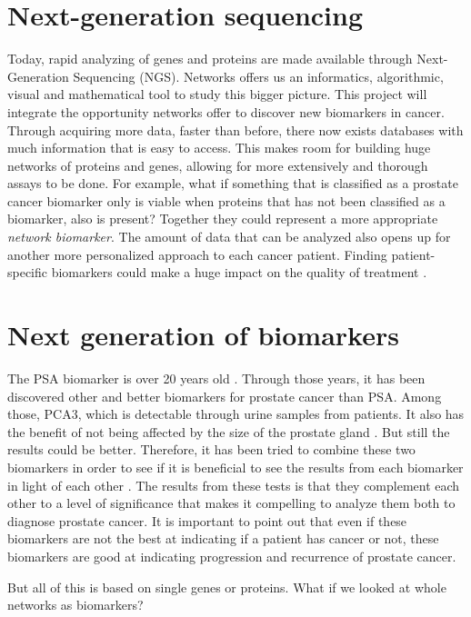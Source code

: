 \documentclass[UKenglish]{ifimaster}
\begin{document}
\chapter{Next-generation sequencing}
Today, rapid analyzing of genes and proteins are made available through Next-Generation Sequencing (NGS)\cite{ngs1}.
Networks offers us an informatics, algorithmic, visual and mathematical tool to study this bigger picture. This project
will integrate the opportunity networks offer to discover new biomarkers in cancer.  Through acquiring more data, faster
than before, there now exists databases with much information that is easy to access. This makes room for building huge
networks of proteins and genes, allowing for more extensively and thorough assays to be done. For example, what if
something that is classified as a prostate cancer biomarker only is viable when proteins that has not been classified as
a biomarker, also is present? Together they could represent a more appropriate
\emph{network biomarker}.
The amount of data that can be analyzed also opens up for another more personalized approach to each cancer patient.
Finding patient-specific biomarkers could make a huge impact on the quality of treatment \cite{personalized}.
\chapter{Next generation of biomarkers}
The PSA biomarker is over 20 years old \cite{psa-age}. Through those years, it has been discovered other and better
biomarkers for prostate cancer than PSA. Among those, PCA3, which is detectable through urine samples from patients. It
also has the benefit of not being affected by the size of the prostate gland \cite{pca3-size}. But still the results
could be better. Therefore, it has been tried to combine these two biomarkers in order to see if it is beneficial to see
the results from each biomarker in light of each other \cite{beyondpsa}. The results from these tests is that they
complement each other to a level of significance that makes it compelling to analyze them both to diagnose prostate
cancer. It is important to point out that even if these biomarkers are not the best at indicating if a patient has
cancer or not, these biomarkers are good at indicating progression and recurrence of prostate cancer.

But all of this is based on single genes or proteins. What if we looked at whole networks as biomarkers?
\end{document}
